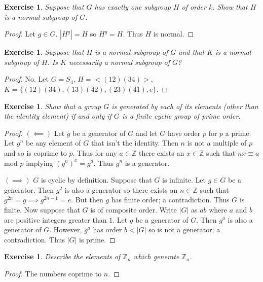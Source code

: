 \documentclass{article}
\newtheorem{exercise}[theorem]{Exercise}
\begin{document}
\begin{exercise}
Suppose that $G$ has exactly one subgroup $H$ of order $k$. Show that $H$ is a normal subgroup of $G$.
\end{exercise}
\begin{proof}
Let $g\in G$. $|H^g|=H$ so $H^g=H$. Thus $H$ is normal.
\end{proof}


\begin{exercise}
Suppose that $H$ is a normal subgroup of $G$ and that $K$ is a normal subgroup of $H$. Is $K$ necessarily a normal subgroup of $G$?
\end{exercise}
\begin{proof}
No. Let $G=S_4$, $H=<(12)(34)>$, $K=\{(12)(34),(13)(42),(23)(41),e\}$.
\end{proof}


\begin{exercise}
Show that a group $G$ is generated by each of its elements (other than the identity element) if and only if $G$ is a finite cyclic group of prime order.
\end{exercise}
\begin{proof}
$(\impliedby)$ Let $g$ be a generator of $G$ and let $G$ have order $p$ for $p$ a prime. Let $g^n$ be any element of $G$ that isn't the identity. Then $n$ is not a multiple of $p$ and so is coprime to $p$. Thus for any $a\in \mathbb{Z}$ there exists an $x\in \mathbb{Z}$ such that $nx\equiv a$ mod $p$ implying $(g^n)^x=g^a$. Thus $g^n$ is a generator.

$(\implies)$ $G$ is cyclic by definition. Suppose that $G$ is infinite. Let $g\in G$ be a generator. Then $g^2$ is also a generator so there exists an $n\in \mathbb{Z}$ such that $g^{2n}=g\implies g^{2n-1}=e$. But then $g$ has finite order; a contradiction. Thus $G$ is finite. Now suppose that $G$ is of composite order. Write $|G|$ as $ab$ where $a$ and $b$ are positive integers greater than $1$. Let $g$ be a generator of $G$. Then $g^a$ is also a generator of $G$. However, $g^a$ has order $b<|G|$ so is not a generator; a contradiction. Thus $|G|$ is prime.
\end{proof}

\begin{exercise}
Describe the elements of $\mathbb{Z}_n$ which generate $\mathbb{Z}_n$.
\end{exercise}
\begin{proof}
The numbers coprime to $n$.
\end{proof}
\end{document}
